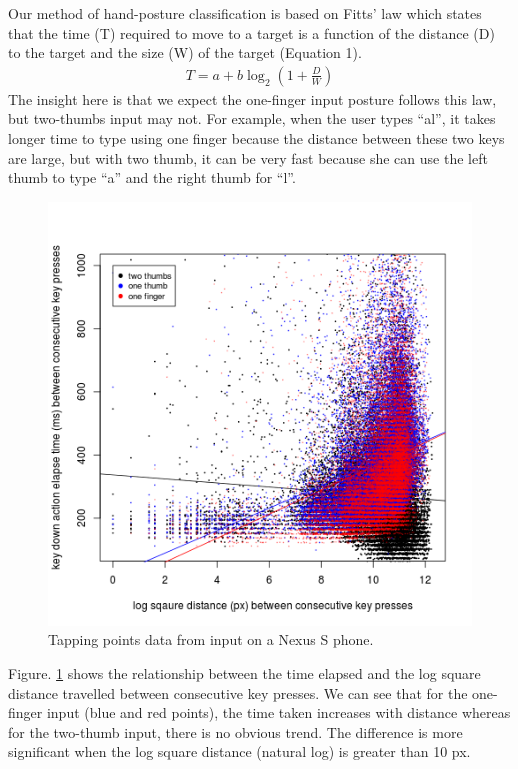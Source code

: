 \documentclass{sigchi}
\begin{document}
Our method of hand-posture classification is based on Fitts’ law which states that the time (T) required to move to a target is a function of the distance (D) to the target and the size (W) of the target (Equation 1).
\begin{align}
T = a + b\log_2(1 + \frac{D}{W})
\end{align}                                                  
The insight here is that we expect the one-finger input posture follows this law,  but two-thumbs input may not. For example, when the user types “al”, it takes longer time to type using one finger because the distance between these two keys are large, but with two thumb, it can be very fast because she can use the left thumb to type “a” and the right thumb for “l”.

\begin{figure}[tb]
  \centering
  \includegraphics[width=1\columnwidth]{figures/time-distance.png}
  \caption{Tapping points data from input on a Nexus S phone.}
  \label{fig:time-distance}
\end{figure}

Figure. \ref{fig:time-distance} shows the relationship between the time elapsed 
and the log square distance travelled between consecutive key presses. We can
see that for the one-finger input (blue and red points), the time taken
increases with distance whereas for the two-thumb input, there is no obvious
trend. The difference is more significant when the log square distance (natural
log) is greater than 10 px.
\end{document}
